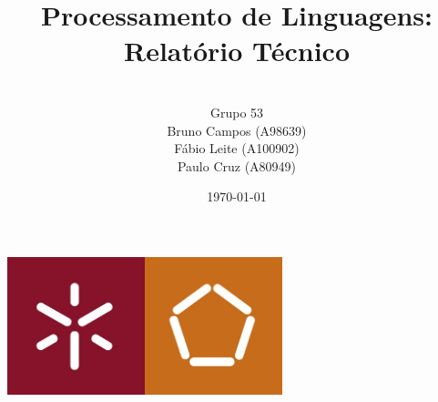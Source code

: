 \title{\bf\Large Processamento de Linguagens: Relatório Técnico
\vspace{0.2cm} }
\author{\\ \large Grupo 53\vspace{0.8cm} \\ \large Bruno Campos (A98639)\\ \large Fábio Leite (A100902) \\\large Paulo Cruz (A80949)\\}  
\date{\today} 

\makeatletter
    \begin{titlepage}
        \begin{center}
	   { \includegraphics[width=8cm]{Imagens/university.jpg}}
	   {\ \\ \ \\}
        \vbox{}\vspace{2cm}
            {\@title }
            {\@author}\vspace{5cm}
            {\@date\\}

        \end{center}
    \end{titlepage}
\makeatother
